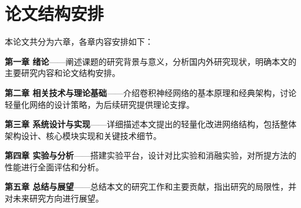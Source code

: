 \section{论文结构安排}

本论文共分为六章，各章内容安排如下：

\textbf{第一章 绪论}——阐述课题的研究背景与意义，分析国内外研究现状，明确本文的主要研究内容和论文结构安排。

\textbf{第二章 相关技术与理论基础}——介绍卷积神经网络的基本原理和经典架构，讨论轻量化网络的设计策略，为后续研究提供理论支撑。

\textbf{第三章 系统设计与实现}——详细描述本文提出的轻量化改进网络结构，包括整体架构设计、核心模块实现和关键技术细节。

\textbf{第四章 实验与分析}——搭建实验平台，设计对比实验和消融实验，对所提方法的性能进行全面评估和分析。

\textbf{第五章 总结与展望}——总结本文的研究工作和主要贡献，指出研究的局限性，并对未来研究方向进行展望。
